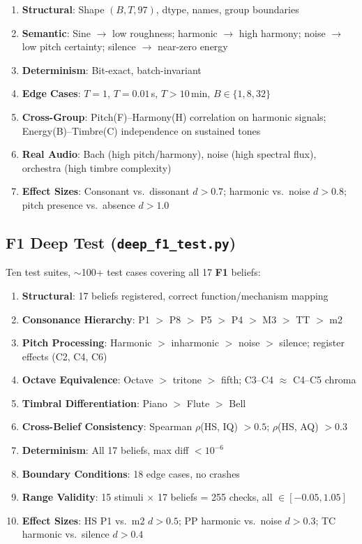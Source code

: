 \documentclass[10pt,twocolumn]{article}
\newcommand{\fn}[1]{\textbf{F#1}}
\begin{document}
\begin{enumerate}[nosep,leftmargin=*]
  \item \textbf{Structural}: Shape $(B,T,97)$, dtype, names, group boundaries
  \item \textbf{Semantic}: Sine $\to$ low roughness; harmonic $\to$ high harmony; noise $\to$ low pitch certainty; silence $\to$ near-zero energy
  \item \textbf{Determinism}: Bit-exact, batch-invariant
  \item \textbf{Edge Cases}: $T\!=\!1$, $T\!=\!0.01$\,s, $T > 10$\,min, $B \in \{1,8,32\}$
  \item \textbf{Cross-Group}: Pitch(F)--Harmony(H) correlation on harmonic signals; Energy(B)--Timbre(C) independence on sustained tones
  \item \textbf{Real Audio}: Bach (high pitch/harmony), noise (high spectral flux), orchestra (high timbre complexity)
  \item \textbf{Effect Sizes}: Consonant vs.\ dissonant $d > 0.7$; harmonic vs.\ noise $d > 0.8$; pitch presence vs.\ absence $d > 1.0$
\end{enumerate}

\subsection{\fn{1} Deep Test (\texttt{deep\_f1\_test.py})}

Ten test suites, $\sim$100+ test cases covering all 17 \fn{1} beliefs:

\begin{enumerate}[nosep,leftmargin=*]
  \item \textbf{Structural}: 17 beliefs registered, correct function/mechanism mapping
  \item \textbf{Consonance Hierarchy}: P1 $>$ P8 $>$ P5 $>$ P4 $>$ M3 $>$ TT $>$ m2
  \item \textbf{Pitch Processing}: Harmonic $>$ inharmonic $>$ noise $>$ silence; register effects (C2, C4, C6)
  \item \textbf{Octave Equivalence}: Octave $>$ tritone $>$ fifth; C3--C4 $\approx$ C4--C5 chroma
  \item \textbf{Timbral Differentiation}: Piano $>$ Flute $>$ Bell
  \item \textbf{Cross-Belief Consistency}: Spearman $\rho$(HS, IQ) $> 0.5$; $\rho$(HS, AQ) $> 0.3$
  \item \textbf{Determinism}: All 17 beliefs, max diff $< 10^{-6}$
  \item \textbf{Boundary Conditions}: 18 edge cases, no crashes
  \item \textbf{Range Validity}: 15 stimuli $\times$ 17 beliefs = 255 checks, all $\in [-0.05, 1.05]$
  \item \textbf{Effect Sizes}: HS P1 vs.\ m2 $d > 0.5$; PP harmonic vs.\ noise $d > 0.3$; TC harmonic vs.\ silence $d > 0.4$
\end{enumerate}
\end{document}

